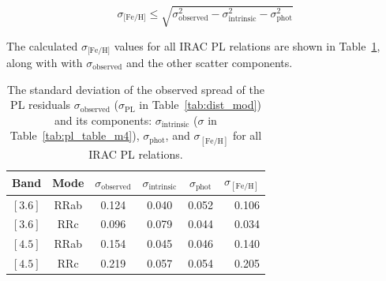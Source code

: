 \documentclass[a4paper,fleqn,usenatbib]{mnras}
\begin{document}
\begin{equation}
\sigma_\text{[Fe/H]} \leq \sqrt{\sigma_{\text{observed}}^2 - \sigma_{\text{intrinsic}}^2 - \sigma_{\text{phot}}^2}
\end{equation}

The calculated $\sigma_\text{[Fe/H]}$ values for all IRAC PL relations are shown in Table~\ref{tab:metallicity_sigma}, along with with $\sigma_{\text{observed}}$ and the other scatter components.

\begin{table}
\centering
\caption{The standard deviation of the observed spread of the PL residuals $\sigma_{\text{observed}}$ ($\sigma_{\text{PL}}$ in Table~\ref{tab:dist_mod}) and its components: $\sigma_{\text{intrinsic}}$ ($\sigma$ in Table~\ref{tab:pl_table_m4}), $\sigma_{\text{phot}}$, and $\sigma_{[\text{Fe/H}]}$ for all IRAC PL relations.}
\label{tab:metallicity_sigma}
\begin{tabular}{lccccr} 
\hline \hline
Band & Mode & $\sigma_{\text{observed}}$ & $\sigma_{\text{intrinsic}}$ & $\sigma_{\text{phot}}$ & $\sigma_{[\text{Fe/H}]}$ \\
\hline
$[3.6]$ & RRab & 0.124 & 0.040 & 0.052 & 0.106 \\
$[3.6]$ & RRc & 0.096 & 0.079 & 0.044 & 0.034 \\
$[4.5]$ & RRab & 0.154 & 0.045 & 0.046 & 0.140 \\
$[4.5]$ & RRc & 0.219 & 0.057 & 0.054 & 0.205 \\
\hline
\end{tabular}
\end{table}

\end{document}
